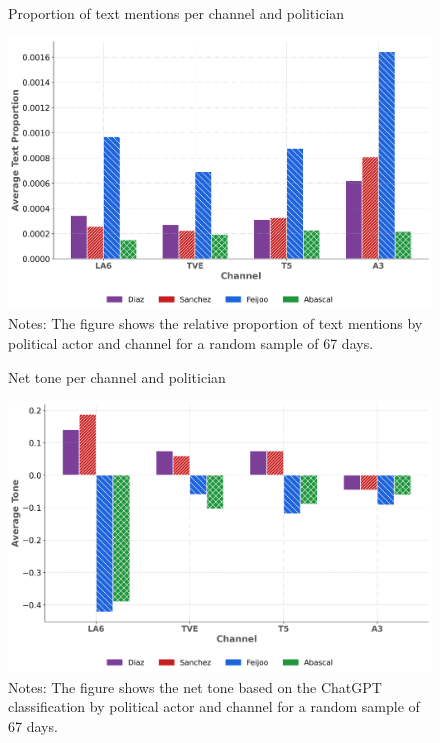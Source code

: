\documentclass[12pt]{article}
\begin{document}
	
	
		\begin{figure}[!htb]
		\caption{Proportion of text mentions per channel and politician}
		\centering
		\includegraphics[width=150mm]{figures/politicians_text_proportions}
		\caption*{\small Notes: The figure shows the relative proportion of text mentions by political actor and channel for a random sample of 67 days. }
		\label{fig:mentions_channel}
	\end{figure}
	
	
		\begin{figure}[!htb]
		\caption{Net tone per channel and politician}
		\centering
		\includegraphics[width=150mm]{figures/politicians_tone_proportions}
		\caption*{\small Notes: The figure shows the net tone based on the ChatGPT classification by political actor and channel for a random sample of 67 days. }
		\label{fig:tone_channel}
	\end{figure}
	
\end{document}
